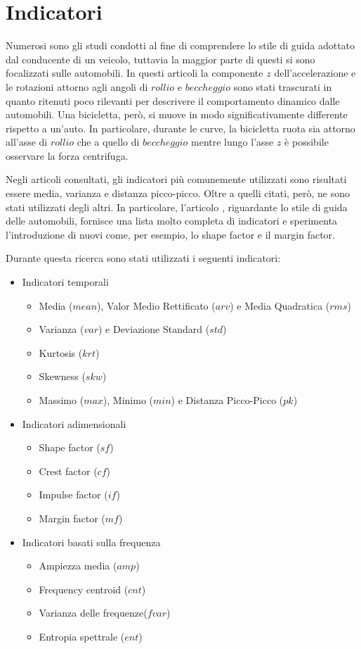\documentclass[12pt]{article}
\begin{document}
\section{Indicatori}
	Numerosi sono gli studi condotti al fine di comprendere lo stile di guida adottato dal conducente di un veicolo, tuttavia la maggior parte di questi si sono focalizzati sulle automobili.
	In questi articoli la componente \(z\) dell'accelerazione e le rotazioni attorno agli angoli di \(rollio\) e \(beccheggio\) sono stati trascurati in quanto ritenuti poco rilevanti per descrivere il comportamento dinamico dalle automobili.
	Una bicicletta, però, si muove in modo significativamente differente rispetto a un'auto.
	In particolare, durante le curve, la bicicletta ruota sia attorno all'asse di \(rollio\) che a quello di \(beccheggio\) mentre lungo l'asse \(z\) è possibile osservare la forza centrifuga.
	
	
	Negli articoli consultati, gli indicatori più comunemente utilizzati sono risultati essere media, varianza e distanza picco-picco. Oltre a quelli citati, però, ne sono stati utilizzati degli altri. In particolare, l'articolo \cite{chen}, riguardante lo stile di guida delle automobili, fornisce una lista molto completa di indicatori e sperimenta l'introduzione di nuovi come, per esempio, lo shape factor e il margin factor.\hfill\break
	
	
	Durante questa ricerca sono stati utilizzati i seguenti indicatori:
	\begin{itemize}
		\item Indicatori temporali
		\begin{itemize}
			\item Media (\(mean\)), Valor Medio Rettificato (\(arv\)) e Media Quadratica (\(rms\))
			\item Varianza (\(var\)) e Deviazione Standard (\(std\))
			\item Kurtosis (\(krt\))
			\item Skewness (\(skw\))
			\item Massimo (\(max\)), Minimo (\(min\)) e Distanza Picco-Picco (\(pk\))
		\end{itemize}
		\item Indicatori adimensionali
		\begin{itemize}
			\item Shape factor (\(sf\))
			\item Crest factor (\(cf\))
			\item Impulse factor (\(if\))
			\item Margin factor (\(mf\))
		\end{itemize}
		\item Indicatori basati sulla frequenza
		\begin{itemize}
			\item Ampiezza media (\(amp\))
			\item Frequency centroid (\(cnt\))
			\item Varianza delle frequenze(\(fvar\))
			\item Entropia spettrale (\(ent\))
		\end{itemize}
	\end{itemize}
	
\end{document}
